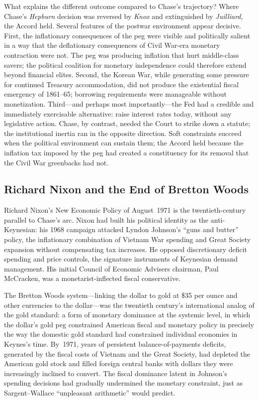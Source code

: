 \documentclass[12pt]{article}
\begin{document}
What explains the different outcome compared to Chase's trajectory?  Where
Chase's \textit{Hepburn} decision was reversed by \textit{Knox} and
extinguished by \textit{Juilliard}, the Accord held.  Several features of
the postwar environment appear decisive.  First, the inflationary
consequences of the peg were visible and politically salient in a way
that the deflationary consequences of Civil War-era monetary contraction
were not.  The peg was producing inflation that hurt middle-class savers;
the political coalition for monetary independence could therefore extend
beyond financial elites.  Second, the Korean War, while generating some
pressure for continued Treasury accommodation, did not produce the
existential fiscal emergency of 1861--65; borrowing requirements were
manageable without monetization.  Third---and perhaps most
importantly---the Fed had a credible and immediately exercisable
alternative: raise interest rates today, without any legislative action.
Chase, by contrast, needed the Court to strike down a statute; the
institutional inertia ran in the opposite direction.  Soft constraints
succeed when the political environment can sustain them; the Accord held
because the inflation tax imposed by the peg had created a constituency
for its removal that the Civil War greenbacks had not.

\subsection{Richard Nixon and the End of Bretton Woods}

Richard Nixon's New Economic Policy of August~1971 is the
twentieth-century parallel to Chase's arc.  Nixon had
built his political identity as the anti-Keynesian: his 1968 campaign
attacked Lyndon Johnson's ``guns and butter'' policy, the inflationary
combination of Vietnam War spending and Great Society expansion without
compensating tax increases.  He opposed discretionary deficit spending
and price controls, the signature instruments of Keynesian demand
management.  His initial Council of Economic Advisers chairman, Paul
McCracken, was a monetarist-inflected fiscal conservative.

The Bretton Woods system---linking the dollar to gold at \$35 per ounce
and other currencies to the dollar---was the twentieth century's
international analog of the gold standard: a form of monetary dominance
at the systemic level, in which the dollar's gold peg constrained American
fiscal and monetary policy in precisely the way the domestic gold
standard had constrained individual economies in Keynes's time.  By~1971,
years of persistent balance-of-payments deficits, generated by the fiscal
costs of Vietnam and the Great Society, had depleted the American gold
stock and filled foreign central banks with dollars they were
increasingly inclined to convert.  The fiscal dominance latent in
Johnson's spending decisions had gradually undermined the monetary
constraint, just as Sargent--Wallace ``unpleasant arithmetic'' would
predict.
\end{document}
